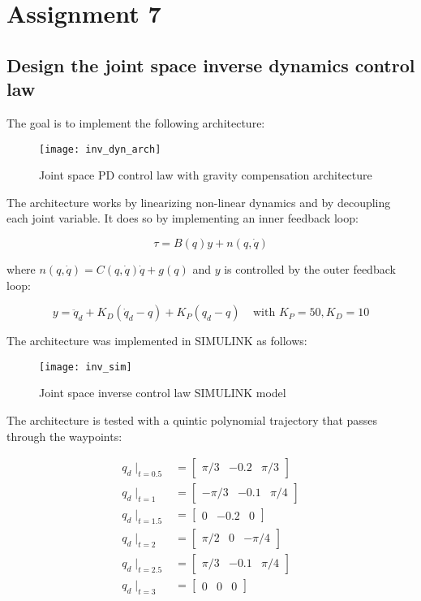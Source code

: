 \section{Assignment 7}

\subsection{Design the joint space inverse dynamics control law}

The goal is to implement the following architecture:

\begin{figure}[h]
\centering
\texttt{[image: inv\_dyn\_arch]}
\caption{Joint space PD control law with gravity compensation architecture}
\end{figure}

The architecture works by linearizing non-linear dynamics and by decoupling each joint variable. It does so by implementing an inner feedback loop:

\begin{equation*}
\tau = B(q)y+n(q,\dot q)
\end{equation*}

where $n(q,\dot q) = C(q,\dot q)\dot q+g(q)$ and $y$ is controlled by the outer feedback loop:

\begin{equation*}
y = \ddot q_d+K_D(\dot q_d-q)+K_P(q_d-q)\;\;\;\;\text{with }K_P=50,K_D=10
\end{equation*}

The architecture was implemented in SIMULINK as follows:

\begin{figure}[h]
\centering
\texttt{[image: inv\_sim]}
\caption{Joint space inverse control law SIMULINK model}
\end{figure}

The architecture is tested with a quintic polynomial trajectory that passes through the waypoints:

\begin{align*}
q_{d}\mid_{t=0.5} &= \begin{bmatrix}
\pi/3 & -0.2 & \pi/3
\end{bmatrix}\\
q_{d}\mid_{t=1} &= \begin{bmatrix}
-\pi/3 & -0.1 & \pi/4
\end{bmatrix}\\
q_{d}\mid_{t=1.5} &= \begin{bmatrix}
0 & -0.2 & 0
\end{bmatrix}\\
q_{d}\mid_{t=2} &= \begin{bmatrix}
\pi/2 & 0 & -\pi/4
\end{bmatrix}\\
q_{d}\mid_{t=2.5} &= \begin{bmatrix}
\pi/3 & -0.1 & \pi/4
\end{bmatrix}\\
q_{d}\mid_{t=3} &= \begin{bmatrix}
0 & 0 & 0
\end{bmatrix}
\end{align*}

